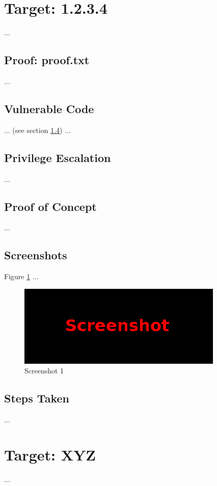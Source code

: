 \section{Target: 1.2.3.4}\label{osce-sec:sec3}
%
...
%
%
%
\subsection{Proof: proof.txt}\label{osce-sec:sec3-proof}
%
...
%
%
%
\subsection{Vulnerable Code}\label{osce-sec:sec3-vulncode}
%
... (see section \ref{osce-sec:sec3-poc}) ...
%
%
%
\subsection{Privilege Escalation}\label{osce-sec:sec3-privescal}
%
...
%
%
%
\subsection{Proof of Concept}\label{osce-sec:sec3-poc}
%
...
%
%
%
\subsection{Screenshots}\label{osce-sec:sec3-screens}
%
Figure \ref{osce-fig:sec3-screen1} ...

\begin{figure}[H]
    \centering
    \includegraphics[width=\textwidth]{img/assignment1/screen1.png}
    \caption{Screenshot 1}\label{osce-fig:sec3-screen1}
\end{figure}
%
%
%
\subsection{Steps Taken}\label{osce-sec:sec3-steps}
%
...
%
%
%
\section{Target: XYZ}\label{osce-sec:sec4}
%
...
%
%
%
